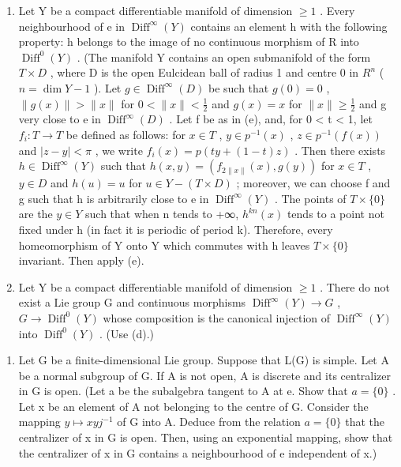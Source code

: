 \begin{enumerate}
\def\labelenumi{(\alph{enumi})}
\setcounter{enumi}{3}
\item
  Let Y be a compact differentiable manifold of dimension \(\geqslant1\) . Every neighbourhood of e in \(\operatorname{Diff}^{\infty}(Y)\) contains an element h with the following property: h belongs to the image of no continuous morphism of R into \(\operatorname{Diff}^{0}(Y)\) . (The manifold Y contains an open submanifold of the form \(T \times D\) , where D is the open Eulcidean ball of radius 1 and centre 0 in \(R^{n}\) ( \(n = \dim Y - 1\) ). Let \(g \in \operatorname{Diff}^{\infty}(D)\) be such that \(g(0) = 0\) , \(\|g(x)\| > \|x\|\) for \(0 < \|x\| < \frac{1}{2}\) and \(g(x) = x\) for \(\|x\| \geqslant \frac{1}{2}\) and g very close to e in \(\operatorname{Diff}^{\infty}(D)\) . Let f be as in (e), and, for 0 \textless{} t \textless{} 1, let \(f_{i}: T \to T\) be defined as follows: for \(x \in T\) , \(y \in p^{-1}(x)\) , \(z \in p^{-1}(f(x))\) and \(|z - y| < \pi\) , we write \(f_{i}(x) = p(ty + (1 - t)z)\) . Then there exists \(h \in \operatorname{Diff}^{\infty}(Y)\) such that \(h(x, y) = (f_{2\|x\|}(x), g(y))\) for \(x \in T\) , \(y \in D\) and \(h(u) = u\) for \(u \in Y - (T \times D)\) ; moreover, we can choose f and g such that h is arbitrarily close to e in \(\operatorname{Diff}^{\infty}(Y)\) . The points of \(T \times \{0\}\) are the \(y \in Y\) such that when n tends to +∞, \(h^{kn}(x)\) tends to a point not fixed under h (in fact it is periodic of period k). Therefore, every homeomorphism of Y onto Y which commutes with h leaves \(T \times \{0\}\) invariant. Then apply (e).
\item
  Let Y be a compact differentiable manifold of dimension \(\geqslant1\) . There do not exist a Lie group G and continuous morphisms \(\operatorname{Diff}^{\infty}(Y)\to G\) , \(G\to\operatorname{Diff}^{0}(Y)\) whose composition is the canonical injection of \(\operatorname{Diff}^{\infty}(Y)\) into \(\operatorname{Diff}^{0}(Y)\) . (Use (d).)
\end{enumerate}

\begin{enumerate}
\def\labelenumi{\arabic{enumi}.}
\setcounter{enumi}{7}
\tightlist
\item
  Let G be a finite-dimensional Lie group. Suppose that L(G) is simple. Let A be a normal subgroup of G. If A is not open, A is discrete and its centralizer in G is open. (Let a be the subalgebra tangent to A at e. Show that \(a = \{0\}\) . Let x be an element of A not belonging to the centre of G. Consider the mapping \(y \mapsto xyj^{-1}\) of G into A. Deduce from the relation \(a = \{0\}\) that the centralizer of x in G is open. Then, using an exponential mapping, show that the centralizer of x in G contains a neighbourhood of e independent of x.)
\end{enumerate}

